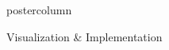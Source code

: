 \documentclass[final,hyperref={pdfpagelabels=false}]{beamer}
\begin{document}
\begin{frame}
\begin{columns}
\begin{column}{1\textwidth}
\begin{columns}[T]
\begin{column}{.484\textwidth}
\begin{beamercolorbox}[center,wd=\textwidth]{postercolumn}
\begin{minipage}[T]{.95\textwidth}
\begin{block}{\footnotesize Visualization \& Implementation}
%
%
%
%
%
%
%
%

\end{block}
\end{minipage}
\end{beamercolorbox}
\end{column}
\end{columns}
\end{column}
\end{columns}
\end{frame}
\end{document}
